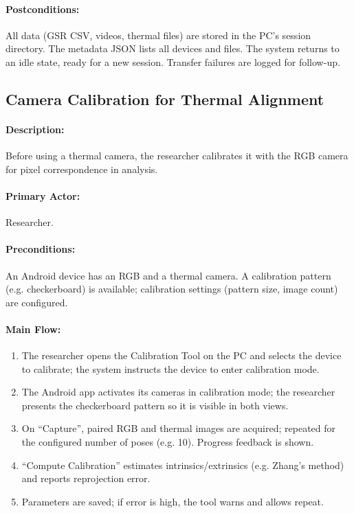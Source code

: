 \documentclass{report}
\begin{document}
    \paragraph{Postconditions:} All data (GSR CSV, videos, thermal files) are stored in the PC's session directory. The metadata JSON lists all devices and files. The system returns to an idle state, ready for a new session. Transfer failures are logged for follow-up.

    \subsection{Camera Calibration for Thermal Alignment}
    \paragraph{Description:} Before using a thermal camera, the researcher calibrates it with the RGB camera for pixel correspondence in analysis.
    \paragraph{Primary Actor:} Researcher.
    \paragraph{Preconditions:} An Android device has an RGB and a thermal camera. A calibration pattern (e.g. checkerboard) is available; calibration settings (pattern size, image count) are configured.
    \paragraph{Main Flow:}
    \begin{enumerate}
        \item The researcher opens the Calibration Tool on the PC and selects the device to calibrate; the system instructs the device to enter calibration mode.
        \item The Android app activates its cameras in calibration mode; the researcher presents the checkerboard pattern so it is visible in both views.
        \item On “Capture”, paired RGB and thermal images are acquired; repeated for the configured number of poses (e.g. 10). Progress feedback is shown.
        \item “Compute Calibration” estimates intrinsics/extrinsics (e.g. Zhang’s method) and reports reprojection error.
        \item Parameters are saved; if error is high, the tool warns and allows repeat.
    \end{enumerate}
\end{document}
